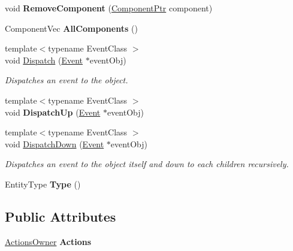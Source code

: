 \begin{DoxyCompactItemize}
\item 
\hypertarget{classDCEngine_1_1Entity_a3f6f5c2dbd1bb46a469f81d91ca352c8}{void {\bfseries Remove\-Component} (\hyperlink{classDCEngine_1_1Component}{Component\-Ptr} component)}\label{classDCEngine_1_1Entity_a3f6f5c2dbd1bb46a469f81d91ca352c8}

\item 
\hypertarget{classDCEngine_1_1Entity_a7b0665d08563328853a31aa791a92db3}{Component\-Vec {\bfseries All\-Components} ()}\label{classDCEngine_1_1Entity_a7b0665d08563328853a31aa791a92db3}

\item 
{\footnotesize template$<$typename Event\-Class $>$ }\\void \hyperlink{classDCEngine_1_1Entity_acee7d3dbacbabb3650057603e88b9908}{Dispatch} (\hyperlink{classDCEngine_1_1Event}{Event} $\ast$event\-Obj)
\begin{DoxyCompactList}\small\item\em Dispatches an event to the object. \end{DoxyCompactList}\item 
\hypertarget{classDCEngine_1_1Entity_a5d6ec6a2c23947fdb12004c1c3052cc3}{{\footnotesize template$<$typename Event\-Class $>$ }\\void {\bfseries Dispatch\-Up} (\hyperlink{classDCEngine_1_1Event}{Event} $\ast$event\-Obj)}\label{classDCEngine_1_1Entity_a5d6ec6a2c23947fdb12004c1c3052cc3}

\item 
{\footnotesize template$<$typename Event\-Class $>$ }\\void \hyperlink{classDCEngine_1_1Entity_aa007d2d5c680e1c34807aea628459530}{Dispatch\-Down} (\hyperlink{classDCEngine_1_1Event}{Event} $\ast$event\-Obj)
\begin{DoxyCompactList}\small\item\em Dispatches an event to the object itself and down to each children recursively. \end{DoxyCompactList}\item 
\hypertarget{classDCEngine_1_1Entity_abe0c3598c08c9c2314398da96cfa9179}{Entity\-Type {\bfseries Type} ()}\label{classDCEngine_1_1Entity_abe0c3598c08c9c2314398da96cfa9179}

\end{DoxyCompactItemize}
\subsection*{Public Attributes}
\begin{DoxyCompactItemize}
\item 
\hypertarget{classDCEngine_1_1Entity_a214de3d4cde2f95ac63b7d1c3d80af7d}{\hyperlink{classDCEngine_1_1ActionsOwner}{Actions\-Owner} {\bfseries Actions}}\label{classDCEngine_1_1Entity_a214de3d4cde2f95ac63b7d1c3d80af7d}

\end{DoxyCompactItemize}

